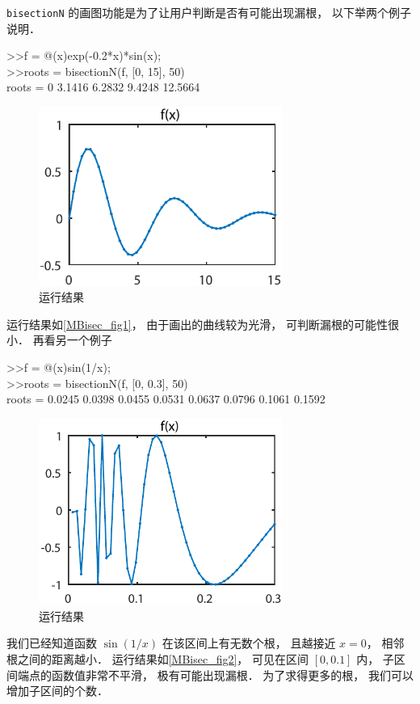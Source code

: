 \texttt{bisectionN} 的画图功能是为了让用户判断是否有可能出现漏根， 以下举两个例子说明．
\begin{Command}
>>f = @(x)exp(-0.2*x)*sin(x); \\
>>roots = bisectionN(f, [0, 15], 50)\\
roots = 0    3.1416    6.2832    9.4248   12.5664
\end{Command}
\begin{figure}[ht]
\centering
\includegraphics[width=8cm]{./figures/MBisec.pdf}
\caption{运行结果} \label{MBisec_fig1}
\end{figure}
运行结果如\autoref{MBisec_fig1}， 由于画出的曲线较为光滑， 可判断漏根的可能性很小． 再看另一个例子
\begin{Command}
>>f = @(x)sin(1/x); \\
>>roots = bisectionN(f, [0, 0.3], 50)\\
roots = 0.0245    0.0398    0.0455    0.0531    0.0637    0.0796    0.1061    0.1592
\end{Command}
\begin{figure}[ht]
\centering
\includegraphics[width=8cm]{./figures/MBisec2.pdf}
\caption{运行结果} \label{MBisec_fig2}
\end{figure}
我们已经知道函数 $\sin(1/x)$ 在该区间上有无数个根， 且越接近 $x = 0$， 相邻根之间的距离越小． 运行结果如\autoref{MBisec_fig2}，  可见在区间 $[0, 0.1]$ 内， 子区间端点的函数值非常不平滑， 极有可能出现漏根． 为了求得更多的根， 我们可以增加子区间的个数．
